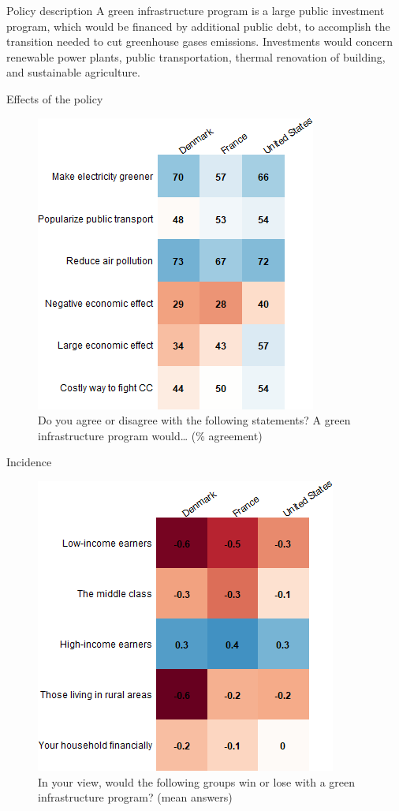 \documentclass[aspectratio=169,9pt,dvipsnames]{beamer}
\begin{document}
\begin{frame}{Policy description}%
A green infrastructure program is a large public investment program, which would be financed by additional public debt, to accomplish the transition needed to cut greenhouse gases emissions. Investments would concern renewable power plants, public transportation, thermal renovation of building, and sustainable agriculture.
\end{frame}


\begin{frame}{Effects of the policy}%


\begin{figure}[h!]
\centering
\caption{Do you agree or disagree with the following statements? A green infrastructure program would… (\% agreement)}
\includegraphics[width=.45\textwidth]{../figures/country_comparison/investments_effect_positive_countries.png}
\end{figure}
\end{frame}


\begin{frame}{Incidence}%
\begin{figure}[h!]
\centering
\caption{In your view, would the following groups win or lose with a green infrastructure program? (mean answers)}
\includegraphics[width=.45\textwidth]{../figures/country_comparison/investments_win_lose_mean_countries.png}
\end{figure}
\end{frame}
\end{document}
